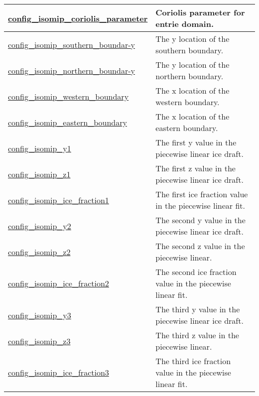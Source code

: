 {\begin{center}
\begin{longtable}{| p{2.0in} || p{4.0in} |}
    \hline
    \hyperref[subsec:nm_sec_config_isomip_coriolis_parameter]{config\_isomip\_coriolis\_parameter} & Coriolis parameter for entrie domain. \\
    \hline
    \hyperref[subsec:nm_sec_config_isomip_southern_boundary]{config\_isomip\_southern\_boundar-}\hyperref[subsec:nm_sec_config_isomip_southern_boundary]{y}& The y location of the southern boundary. \\
    \hline
    \hyperref[subsec:nm_sec_config_isomip_northern_boundary]{config\_isomip\_northern\_boundar-}\hyperref[subsec:nm_sec_config_isomip_northern_boundary]{y}& The y location of the northern boundary. \\
    \hline
    \hyperref[subsec:nm_sec_config_isomip_western_boundary]{config\_isomip\_western\_boundary} & The x location of the western boundary. \\
    \hline
    \hyperref[subsec:nm_sec_config_isomip_eastern_boundary]{config\_isomip\_eastern\_boundary} & The x location of the eastern boundary. \\
    \hline
    \hyperref[subsec:nm_sec_config_isomip_y1]{config\_isomip\_y1} & The first y value in the piecewise linear ice draft. \\
    \hline
    \hyperref[subsec:nm_sec_config_isomip_z1]{config\_isomip\_z1} & The first z value in the piecewise linear ice draft. \\
    \hline
    \hyperref[subsec:nm_sec_config_isomip_ice_fraction1]{config\_isomip\_ice\_fraction1} & The first ice fraction value in the piecewise linear fit. \\
    \hline
    \hyperref[subsec:nm_sec_config_isomip_y2]{config\_isomip\_y2} & The second y value in the piecewise linear ice draft. \\
    \hline
    \hyperref[subsec:nm_sec_config_isomip_z2]{config\_isomip\_z2} & The second z value in the piecewise linear. \\
    \hline
    \hyperref[subsec:nm_sec_config_isomip_ice_fraction2]{config\_isomip\_ice\_fraction2} & The second ice fraction value in the piecewise linear fit. \\
    \hline
    \hyperref[subsec:nm_sec_config_isomip_y3]{config\_isomip\_y3} & The third y value in the piecewise linear ice draft. \\
    \hline
    \hyperref[subsec:nm_sec_config_isomip_z3]{config\_isomip\_z3} & The third z value in the piecewise linear. \\
    \hline
    \hyperref[subsec:nm_sec_config_isomip_ice_fraction3]{config\_isomip\_ice\_fraction3} & The third ice fraction value in the piecewise linear fit. \\
    \hline
\end{longtable}
\end{center}
}
